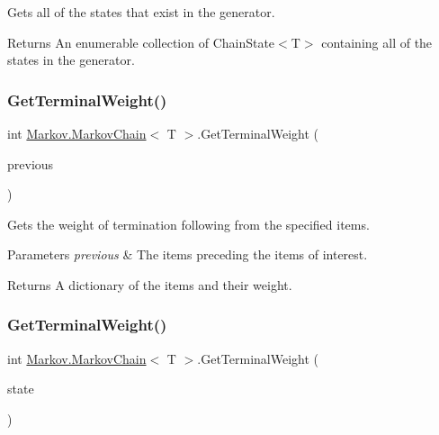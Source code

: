 Gets all of the states that exist in the generator. 

\begin{DoxyReturn}{Returns}
An enumerable collection of Chain\+State$<$\+T$>$ containing all of the states in the generator.
\end{DoxyReturn}
\mbox{\label{class_markov_1_1_markov_chain_a893aace9c71c5837682db3827a5a2426}} 
\subsubsection{\texorpdfstring{Get\+Terminal\+Weight()}{GetTerminalWeight()}\hspace{0.1cm}{\footnotesize\ttfamily [1/2]}}
{\footnotesize\ttfamily int \mbox{\hyperlink{class_markov_1_1_markov_chain}{Markov.\+Markov\+Chain}}$<$ T $>$.Get\+Terminal\+Weight (\begin{DoxyParamCaption}\item[{I\+Enumerable$<$ T $>$}]{previous }\end{DoxyParamCaption})}



Gets the weight of termination following from the specified items. 


\begin{DoxyParams}{Parameters}
{\em previous} & The items preceding the items of interest.\\
\hline
\end{DoxyParams}
\begin{DoxyReturn}{Returns}
A dictionary of the items and their weight.
\end{DoxyReturn}
\mbox{\label{class_markov_1_1_markov_chain_a51cbf6330b16387447e761749161b768}} 
\subsubsection{\texorpdfstring{Get\+Terminal\+Weight()}{GetTerminalWeight()}\hspace{0.1cm}{\footnotesize\ttfamily [2/2]}}
{\footnotesize\ttfamily int \mbox{\hyperlink{class_markov_1_1_markov_chain}{Markov.\+Markov\+Chain}}$<$ T $>$.Get\+Terminal\+Weight (\begin{DoxyParamCaption}\item[{\mbox{\hyperlink{class_markov_1_1_chain_state}{Chain\+State}}$<$ T $>$}]{state }\end{DoxyParamCaption})}




